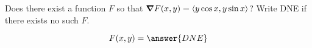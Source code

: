 \documentclass{ximera}
\author{David Guichard \and Neal Koblitz \and H. Jerome Keisler \and Albert Scheller \and Barry Balof \and Mike Wills \and Matthew Carr}
\begin{document}
\begin{exercise}




Does there exist a function $F$ so that $\boldsymbol\nabla F(x,y)=\left\langle y\cos x,y \sin x\right\rangle$? Write DNE if there exists no such $F$. 

\begin{prompt}
\[
F(x,y)=\answer{DNE}
\]
\end{prompt}
\end{exercise}
\end{document}

